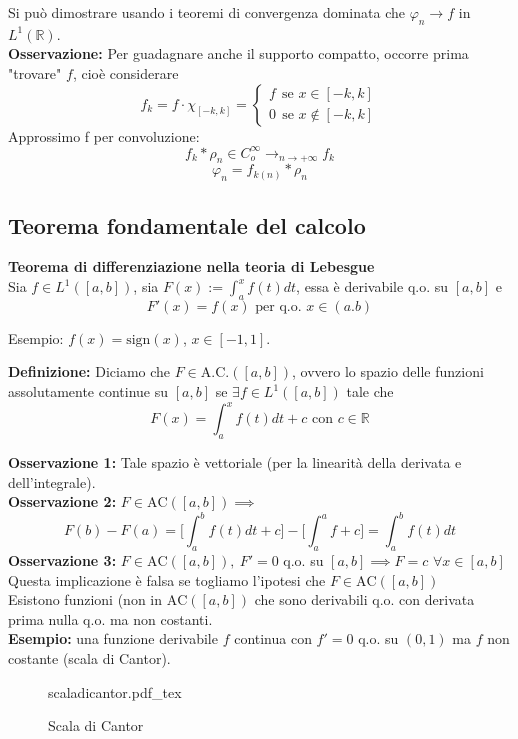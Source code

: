 \documentclass[a4paper]{article}
\newcommand{\incfig}[1]{%
	\def\svgwidth{\columnwidth}
	{#1.pdf_tex}
}
\newcommand{\R}{\mathbb{R}}
\begin{document}
Si può dimostrare usando i teoremi di convergenza dominata che $\varphi_n\to f$ in $L^{1}(\R)$.
\\\textbf{Osservazione:} Per guadagnare anche il supporto compatto, occorre prima "trovare" $f$, cioè considerare
\[f_k=f\cdot \chi_{[-k,k]}=\begin{cases}
	f\ \ \text{se }x\in [-k,k]
	\\0\ \ \text{se }x\not\in [-k,k]
\end{cases}\]
Approssimo f per convoluzione:
\[f_k*\rho_n\in C_o^\infty\to _{n\to +\infty}f_k\]
\[\varphi_n=f_{k(n)}*\rho_n\]
\subsection{Teorema fondamentale del calcolo}
\begin{tcolorbox}
\textbf{Teorema di differenziazione nella teoria di Lebesgue}
\\Sia $f\in L^{1}([a,b])$, sia $F(x):=\int_{a}^{x} f(t)dt$, essa è derivabile q.o. su $[a,b]$ e
\[F'(x)=f(x)\text{ per q.o. }x\in (a.b)\]
\end{tcolorbox}
Esempio: $f(x)=\text{sign}(x)$, $x\in [-1,1]$.
\begin{tcolorbox}
	\textbf{Definizione: }Diciamo che $F\in \text{A.C.}([a,b])$, ovvero lo spazio delle funzioni assolutamente continue su $[a,b]$ se $\exists f\in L^{1}([a,b])$ tale che
	\[F(x)=\int_{a}^{x} f(t)dt+c\text{ con }c\in \R\]
\end{tcolorbox}
\textbf{Osservazione 1:} Tale spazio è vettoriale (per la linearità della derivata e dell'integrale).
\\\textbf{Osservazione 2:} $F\in \text{AC}([a,b])\implies$ 
\[F(b)-F(a)=\bigg[\int_{a}^{b} f(t)dt+c \bigg]-\bigg[\int_{a}^{a} f+c \bigg]=\int_{a}^{b} f(t)dt   \]
\textbf{Osservazione 3:} $F\in \text{AC}([a,b]),\ F'=0$ q.o. su  $[a,b]\implies F=c$ $\forall x\in [a,b]$ \\
Questa implicazione è falsa se togliamo l'ipotesi che $F\in \text{AC}([a,b])$ 
\\Esistono funzioni (non in $\text{AC}([a,b])$ che sono derivabili q.o. con derivata prima nulla q.o. ma non costanti.
\\\textbf{Esempio:} una funzione derivabile $f$ continua con  $f'=0$ q.o. su $(0,1)$ ma $f$ non costante (scala di Cantor).
\begin{figure}[ht]
    \centering
    \incfig{scaladicantor}
    \caption{Scala di Cantor}
    \label{fig:scaladicantor}
\end{figure}
\end{document}
